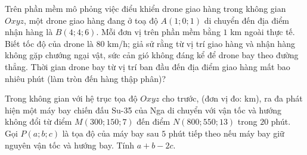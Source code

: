 \begin{bt}%
Trên phần mềm mô phỏng việc điểu khiển drone giao hàng trong không gian $O x y z$, một drone giao hàng đang ở toạ độ $A(1 ; 0 ; 1)$ di chuyển đến địa điểm nhận hàng là $B(4 ; 4 ; 6)$. Mỗi đơn vị trên phần mềm bằng $1$ km ngoài thực tế. Biết tốc độ của drone là $80$ km/h; giả sử rằng từ vị trí giao hàng và nhận hàng không gặp chướng ngại vật, sức cản gió không đáng kể để drone bay theo đường thẳng. Thời gian drone bay từ vị trí ban đầu đến địa điểm giao hàng mất bao nhiêu phút (làm tròn đến hàng thập phân)?
\end{bt}

\begin{bt}%
Trong không gian với hệ trục tọa độ $O x y z$ cho trước, (đơn vị đo: km), ra đa phát hiện một máy bay chiến đấu Su-35 của Nga di chuyển với vận tốc và hướng không đổi từ điểm $M(300 ; 150 ; 7)$ đến điểm $N(800 ; 550 ; 13)$ trong $20$ phút. Gọi $P(a;b;c)$ là tọa độ của máy bay sau $5$ phút tiếp theo nếu máy bay giữ nguyên vận tốc và hướng bay. Tính $a+b-2c$.
\end{bt}

